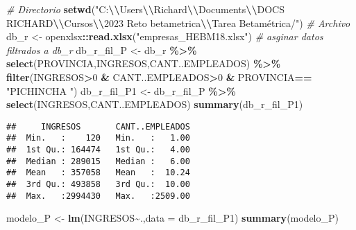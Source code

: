 \documentclass[
]{article}
\newenvironment{Shaded}{\begin{snugshade}}{\end{snugshade}}
\newcommand{\AttributeTok}[1]{\textcolor[rgb]{0.13,0.29,0.53}{#1}}
\newcommand{\CommentTok}[1]{\textcolor[rgb]{0.56,0.35,0.01}{\textit{#1}}}
\newcommand{\DecValTok}[1]{\textcolor[rgb]{0.00,0.00,0.81}{#1}}
\newcommand{\FunctionTok}[1]{\textcolor[rgb]{0.13,0.29,0.53}{\textbf{#1}}}
\newcommand{\NormalTok}[1]{#1}
\newcommand{\OtherTok}[1]{\textcolor[rgb]{0.56,0.35,0.01}{#1}}
\newcommand{\SpecialCharTok}[1]{\textcolor[rgb]{0.81,0.36,0.00}{\textbf{#1}}}
\newcommand{\StringTok}[1]{\textcolor[rgb]{0.31,0.60,0.02}{#1}}
\begin{document}
\begin{Shaded}
\begin{Highlighting}[]
\CommentTok{\# Directorio}
\FunctionTok{setwd}\NormalTok{(}\StringTok{"C:}\SpecialCharTok{\textbackslash{}\textbackslash{}}\StringTok{Users}\SpecialCharTok{\textbackslash{}\textbackslash{}}\StringTok{Richard}\SpecialCharTok{\textbackslash{}\textbackslash{}}\StringTok{Documents}\SpecialCharTok{\textbackslash{}\textbackslash{}}\StringTok{DOCS RICHARD}\SpecialCharTok{\textbackslash{}\textbackslash{}}\StringTok{Cursos}\SpecialCharTok{\textbackslash{}\textbackslash{}}\StringTok{2023 Reto betametrica}\SpecialCharTok{\textbackslash{}\textbackslash{}}\StringTok{Tarea Betamétrica/"}\NormalTok{)}
\CommentTok{\# Archivo}
\NormalTok{db\_r }\OtherTok{\textless{}{-}}\NormalTok{ openxlsx}\SpecialCharTok{::}\FunctionTok{read.xlsx}\NormalTok{(}\StringTok{"empresas\_HEBM18.xlsx"}\NormalTok{)}
\CommentTok{\# asginar datos filtrados a db\_r}
\NormalTok{db\_r\_fil\_P }\OtherTok{\textless{}{-}}\NormalTok{ db\_r }\SpecialCharTok{\%\textgreater{}\%} 
  \FunctionTok{select}\NormalTok{(PROVINCIA,INGRESOS,CANT..EMPLEADOS) }\SpecialCharTok{\%\textgreater{}\%} 
  \FunctionTok{filter}\NormalTok{(INGRESOS}\SpecialCharTok{\textgreater{}}\DecValTok{0} \SpecialCharTok{\&}\NormalTok{ CANT..EMPLEADOS}\SpecialCharTok{\textgreater{}}\DecValTok{0} \SpecialCharTok{\&}\NormalTok{ PROVINCIA}\SpecialCharTok{==} \StringTok{"PICHINCHA                                         "}\NormalTok{)}
\NormalTok{db\_r\_fil\_P1 }\OtherTok{\textless{}{-}}\NormalTok{ db\_r\_fil\_P }\SpecialCharTok{\%\textgreater{}\%} 
  \FunctionTok{select}\NormalTok{(INGRESOS,CANT..EMPLEADOS)}
\FunctionTok{summary}\NormalTok{(db\_r\_fil\_P1)}
\end{Highlighting}
\end{Shaded}

\begin{verbatim}
##     INGRESOS       CANT..EMPLEADOS  
##  Min.   :    120   Min.   :   1.00  
##  1st Qu.: 164474   1st Qu.:   4.00  
##  Median : 289015   Median :   6.00  
##  Mean   : 357058   Mean   :  10.24  
##  3rd Qu.: 493858   3rd Qu.:  10.00  
##  Max.   :2994430   Max.   :2509.00
\end{verbatim}

\begin{Shaded}
\begin{Highlighting}[]
\NormalTok{modelo\_P }\OtherTok{\textless{}{-}} \FunctionTok{lm}\NormalTok{(INGRESOS}\SpecialCharTok{\textasciitilde{}}\NormalTok{.,}\AttributeTok{data =}\NormalTok{ db\_r\_fil\_P1)}
\FunctionTok{summary}\NormalTok{(modelo\_P)}
\end{Highlighting}
\end{Shaded}
\end{document}
